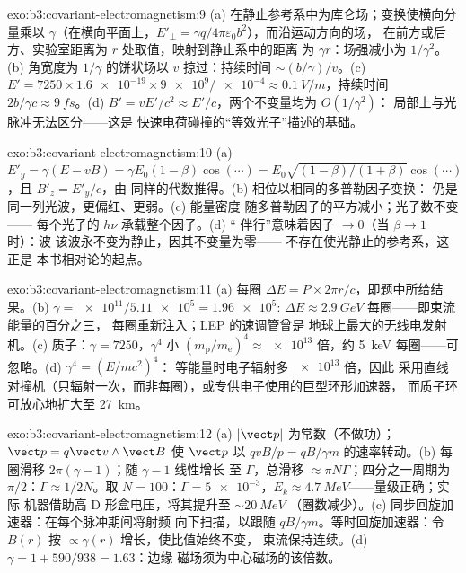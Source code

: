 \begin{solution}{exo:b3:covariant-electromagnetism:9}
(a) 在静止参考系中为库仑场；变换使横向分量乘以
$\gamma$（在横向平面上，$E'_\perp = \gamma
q/4\pi\varepsilon_0b^2$），而沿运动方向的场，
在前方或后方、实验室距离为 $r$ 处取值，映射到静止系中的距离
为 $\gamma r$：场强减小为 $1/\gamma^2$。(b) 角宽度为
$1/\gamma$ 的饼状场以 $v$ 掠过：持续时间 $\sim (b/\gamma)/v$。(c)
$E' = 7250 \times \num{1.6e-19} \times \num{9e9}/\num{e-4} \approx
\qty{0.1}{V/m}$，持续时间 $2b/\gamma c \approx \qty{9}{fs}$。(d)
$B' = vE'/c^2 \approx E'/c$，两个不变量均为 $O(1/\gamma^2)$：
局部上与光脉冲无法区分——这是
快速电荷碰撞的“等效光子”描述的基础。
\end{solution}

\begin{solution}{exo:b3:covariant-electromagnetism:10}
(a) $E'_y = \gamma(E - vB) = \gamma E_0(1 - \beta)\cos(\cdots) =
E_0\sqrt{(1-\beta)/(1+\beta)}\cos(\cdots)$，且 $B'_z = E'_y/c$，由
同样的代数推得。(b) 相位以相同的多普勒因子变换：
仍是同一列光波，更偏红、更弱。(c) 能量密度
随多普勒因子的平方减小；光子数不变——
每个光子的 $h\nu$ 承载整个因子。(d) “
伴行”意味着因子 $\to 0$（当 $\beta \to 1$ 时）：波
该波永不变为静止，因其不变量为零——
不存在使光静止的参考系，这正是
本书相对论的起点。
\end{solution}

\begin{solution}{exo:b3:covariant-electromagnetism:11}
(a) 每圈 $\Delta E = P \times 2\pi r/c$，即题中所给结果。(b)
$\gamma = \num{e11}/\num{5.11e5} = \num{1.96e5}$: $\Delta E \approx
\qty{2.9}{GeV}$ 每圈——即束流能量的百分之三，
每圈重新注入；LEP 的速调管曾是
地球上最大的无线电发射机。(c) 质子：$\gamma = 7250$，$\gamma^4$
小 $(m_{\text{p}}/m_{\text{e}})^4 \approx \num{e13}$ 倍，约
\qty{5}{keV} 每圈——可忽略。(d) $\gamma^4 = (E/mc^2)^4$：
等能量时电子辐射多 $\num{e13}$ 倍，因此
采用直线对撞机（只辐射一次，而非每圈），或专供电子使用的巨型环形加速器，
而质子环可放心地扩大至 \qty{27}{km}。
\end{solution}

\begin{solution}{exo:b3:covariant-electromagnetism:12}
(a) $|\vect p|$ 为常数（不做功）；$\dot{\vect p} = q\vect
v\wedge\vect B$ 使 $\vect p$ 以 $qvB/p = qB/\gamma m$ 的速率转动。(b)
每圈滑移 $2\pi(\gamma - 1)$；随 $\gamma - 1$ 线性增长
至 $\Gamma$，总滑移 $\approx \pi N\Gamma$；四分之一周期为
$\pi/2$：$\Gamma \approx 1/2N$。取 $N = 100$：$\Gamma =
\num{5e-3}$，$E_k \approx \qty{4.7}{MeV}$——量级正确；实际
机器借助高 D 形盒电压，将其提升至 $\sim\qty{20}{MeV}$
（圈数减少）。(c) 同步回旋加速器：在每个脉冲期间将射频
向下扫描，以跟随 $qB/\gamma m$。等时回旋加速器：令
$B(r)$ 按 $\propto\gamma(r)$ 增长，使比值始终不变，
束流保持连续。(d) $\gamma = 1 + 590/938 = 1.63$：边缘
磁场须为中心磁场的该倍数。
\end{solution}

